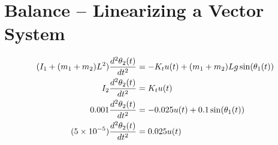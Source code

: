 \documentclass[]{article}
\begin{document}
\section{Balance -- Linearizing a Vector System}

\begin{align}
	(I_1 + (m_1 + m_2)L^2) \frac{d^2 \theta_2(t)}{dt^2} &= -K_t u(t) + (m_1 + m_2) L g \sin(\theta_1(t)) \\
	I_2 \frac{d^2 \theta_2(t)}{dt^2} &= K_t u(t) \\
	0.001\frac{d^2 \theta_2(t)}{dt^2} &= -0.025 u(t) + 0.1 \sin(\theta_1(t)) \\
	(\num{5d-5})\frac{d^2 \theta_2(t)}{dt^2} &= 0.025 u(t)
\end{align}

\subsection{}
\end{document}
